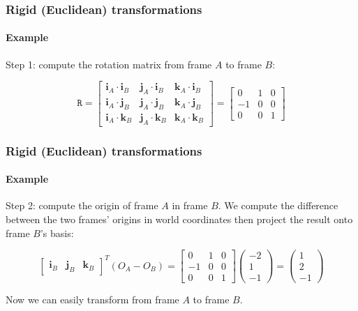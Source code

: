 \documentclass[aspectratio=169]{beamer}
\renewcommand{\vec}[1]{\boldsymbol{#1}}
\newcommand{\mat}[1]{\mathtt{#1}}
\begin{document}
\begin{frame}
\frametitle{Rigid (Euclidean) transformations}
\framesubtitle{Example}

Step 1: compute the rotation matrix from frame $A$ to frame $B$:

\begin{equation*}
\mat{R} = \begin{bmatrix}
\vec{i}_A \cdot \vec{i}_B &
\vec{j}_A \cdot \vec{i}_B &
\vec{k}_A \cdot \vec{i}_B \\
\vec{i}_A \cdot \vec{j}_B &
\vec{j}_A \cdot \vec{j}_B &
\vec{k}_A \cdot \vec{j}_B \\
\vec{i}_A \cdot \vec{k}_B &
\vec{j}_A \cdot \vec{k}_B &
\vec{k}_A \cdot \vec{k}_B
\end{bmatrix} =
\begin{bmatrix}
 0 & 1 & 0 \\
-1 & 0 & 0 \\
 0 & 0 & 1
\end{bmatrix}
\end{equation*}

\end{frame}

\begin{frame}
\frametitle{Rigid (Euclidean) transformations}
\framesubtitle{Example}

Step 2: compute the origin of frame $A$ in frame $B$.  We compute the
difference between the two frames' origins in world coordinates then
project the result onto frame $B$'s basis:

\begin{equation*}
\begin{bmatrix}
\vec{i}_B &  \vec{j}_B & \vec{k}_B
\end{bmatrix}^T ( O_A - O_B ) =
\begin{bmatrix}
0 & 1 & 0 \\ -1 & 0 & 0 \\ 0 & 0 & 1
\end{bmatrix}
\begin{pmatrix} -2 \\ 1 \\ -1 \end{pmatrix} =
\begin{pmatrix} 1 \\ 2 \\ -1 \end{pmatrix}
\end{equation*}

Now we can easily transform from frame $A$ to frame $B$.

\end{frame}
\end{document}
